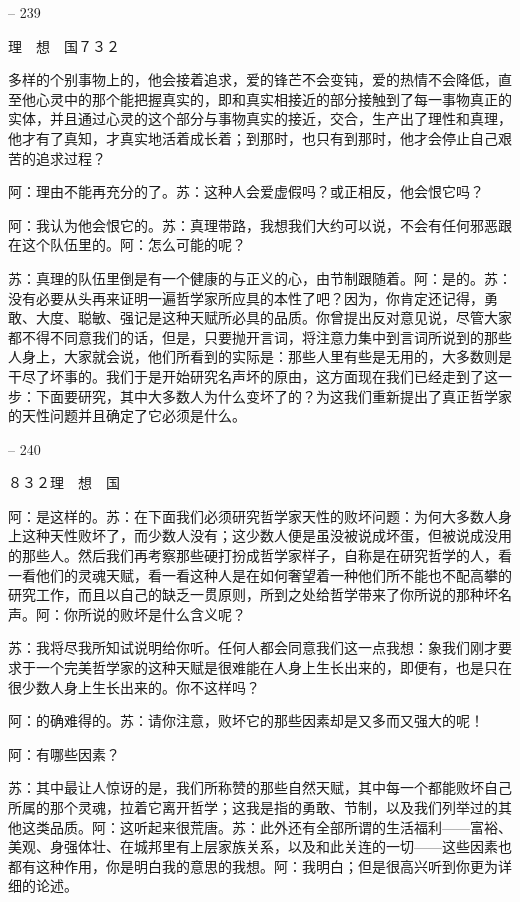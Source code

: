 \documentclass[11pt,oneside]{book}
\begin{document}
\begin{common-format}
    

-- 239

    理　想　国７３２

    多样的个别事物上的，他会接着追求，爱的锋芒不会变钝，爱的热情不会降低，直至他心灵中的那个能把握真实的，即和真实相接近的部分接触到了每一事物真正的实体，并且通过心灵的这个部分与事物真实的接近，交合，生产出了理性和真理，他才有了真知，才真实地活着成长着；到那时，也只有到那时，他才会停止自己艰苦的追求过程？

    阿：理由不能再充分的了。苏：这种人会爱虚假吗？或正相反，他会恨它吗？

    阿：我认为他会恨它的。苏：真理带路，我想我们大约可以说，不会有任何邪恶跟在这个队伍里的。阿：怎么可能的呢？

    苏：真理的队伍里倒是有一个健康的与正义的心，由节制跟随着。阿：是的。苏：没有必要从头再来证明一遍哲学家所应具的本性了吧？因为，你肯定还记得，勇敢、大度、聪敏、强记是这种天赋所必具的品质。你曾提出反对意见说，尽管大家都不得不同意我们的话，但是，只要抛开言词，将注意力集中到言词所说到的那些人身上，大家就会说，他们所看到的实际是：那些人里有些是无用的，大多数则是干尽了坏事的。我们于是开始研究名声坏的原由，这方面现在我们已经走到了这一步：下面要研究，其中大多数人为什么变坏了的？为这我们重新提出了真正哲学家的天性问题并且确定了它必须是什么。

    

-- 240

    ８３２理　想　国

    阿：是这样的。苏：在下面我们必须研究哲学家天性的败坏问题：为何大多数人身上这种天性败坏了，而少数人没有；这少数人便是虽没被说成坏蛋，但被说成没用的那些人。然后我们再考察那些硬打扮成哲学家样子，自称是在研究哲学的人，看一看他们的灵魂天赋，看一看这种人是在如何奢望着一种他们所不能也不配高攀的研究工作，而且以自己的缺乏一贯原则，所到之处给哲学带来了你所说的那种坏名声。阿：你所说的败坏是什么含义呢？

    苏：我将尽我所知试说明给你听。任何人都会同意我们这一点我想：象我们刚才要求于一个完美哲学家的这种天赋是很难能在人身上生长出来的，即便有，也是只在很少数人身上生长出来的。你不这样吗？

    阿：的确难得的。苏：请你注意，败坏它的那些因素却是又多而又强大的呢！

    阿：有哪些因素？

    苏：其中最让人惊讶的是，我们所称赞的那些自然天赋，其中每一个都能败坏自己所属的那个灵魂，拉着它离开哲学；这我是指的勇敢、节制，以及我们列举过的其他这类品质。阿：这听起来很荒唐。苏：此外还有全部所谓的生活福利——富裕、美观、身强体壮、在城邦里有上层家族关系，以及和此关连的一切——这些因素也都有这种作用，你是明白我的意思的我想。阿：我明白；但是很高兴听到你更为详细的论述。


\end{common-format}
\end{document}
